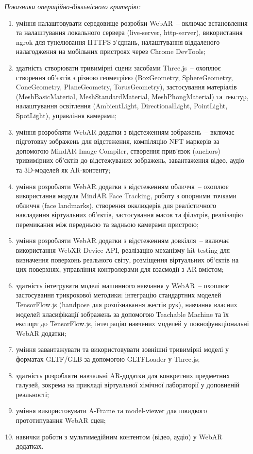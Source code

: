 \textit{Показники операційно-діяльнісного критерію:}
\begin{enumerate}
\item уміння налаштовувати середовище розробки WebAR~-- включає встановлення та налаштування локального сервера (live-server, http-server), використання ngrok для тунелювання HTTPS-з'єднань, налаштування віддаленого налагодження на мобільних пристроях через Chrome DevTools;
\item здатність створювати тривимірні сцени засобами Three.js~-- охоплює створення об'єктів з різною геометрією (BoxGeometry, SphereGeometry, ConeGeometry, PlaneGeometry, TorusGeometry), застосування матеріалів (MeshBasicMaterial, MeshStandardMaterial, MeshPhongMaterial) та текстур, налаштування освітлення (AmbientLight, DirectionalLight, PointLight, SpotLight), управління камерами;
\item уміння розробляти WebAR додатки з відстеженням зображень~-- включає підготовку зображень для відстеження, компіляцію NFT маркерів за допомогою MindAR Image Compiler, створення прив'язок (anchors) тривимірних об'єктів до відстежуваних зображень, завантаження відео, аудіо та 3D-моделей як AR-контенту;
\item уміння розробляти WebAR додатки з відстеженням обличчя~-- охоплює використання модуля MindAR Face Tracking, роботу з опорними точками обличчя (face landmarks), створення окклюдерів для реалістичного накладання віртуальних об'єктів, застосування масок та фільтрів, реалізацію перемикання між передньою та задньою камерами пристрою;
\item уміння розробляти WebAR додатки з відстеженням довкілля~-- включає використання WebXR Device API, реалізацію механізму hit testing для визначення поверхонь реального світу, розміщення віртуальних об'єктів на цих поверхнях, управління контролерами для взаємодії з AR-вмістом;
\item здатність інтегрувати моделі машинного навчання у WebAR~-- охоплює застосування трикрокової методики: інтеграцію стандартних моделей TensorFlow.js (handpose для розпізнавання жестів рук), навчання власних моделей класифікації зображень за допомогою Teachable Machine та їх експорт до TensorFlow.js, інтеграцію навчених моделей у повнофункціональні WebAR додатки;
\item уміння завантажувати та використовувати зовнішні тривимірні моделі у форматах GLTF/GLB за допомогою GLTFLoader у Three.js;
\item здатність розробляти навчальні AR-додатки для конкретних предметних галузей, зокрема на прикладі віртуальної хімічної лабораторії у доповненій реальності;
\item уміння використовувати A-Frame та model-viewer для швидкого прототипування WebAR сцен;
\item навички роботи з мультимедійним контентом (відео, аудіо) у WebAR додатках.
\end{enumerate}

